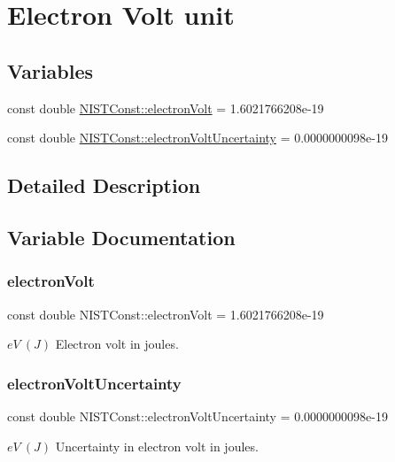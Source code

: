 \hypertarget{group___electron_volt_unit}{}\section{Electron Volt unit}
\label{group___electron_volt_unit}
\subsection*{Variables}
\begin{DoxyCompactItemize}
\item 
const double \hyperlink{group___electron_volt_unit_ga24c6771adb5c4de68575b1a77f0b2415}{N\+I\+S\+T\+Const\+::electron\+Volt} = 1.\+6021766208e-\/19
\item 
const double \hyperlink{group___electron_volt_unit_ga2318526ee8cb14064a4a45806fd8cb0c}{N\+I\+S\+T\+Const\+::electron\+Volt\+Uncertainty} = 0.\+0000000098e-\/19
\end{DoxyCompactItemize}


\subsection{Detailed Description}


\subsection{Variable Documentation}
\mbox{\label{group___electron_volt_unit_ga24c6771adb5c4de68575b1a77f0b2415}} 
\subsubsection{\texorpdfstring{electron\+Volt}{electronVolt}}
{\footnotesize\ttfamily const double N\+I\+S\+T\+Const\+::electron\+Volt = 1.\+6021766208e-\/19}

$eV \ (J)$ Electron volt in joules. \mbox{\label{group___electron_volt_unit_ga2318526ee8cb14064a4a45806fd8cb0c}} 
\subsubsection{\texorpdfstring{electron\+Volt\+Uncertainty}{electronVoltUncertainty}}
{\footnotesize\ttfamily const double N\+I\+S\+T\+Const\+::electron\+Volt\+Uncertainty = 0.\+0000000098e-\/19}

$eV \ (J)$ Uncertainty in electron volt in joules. 